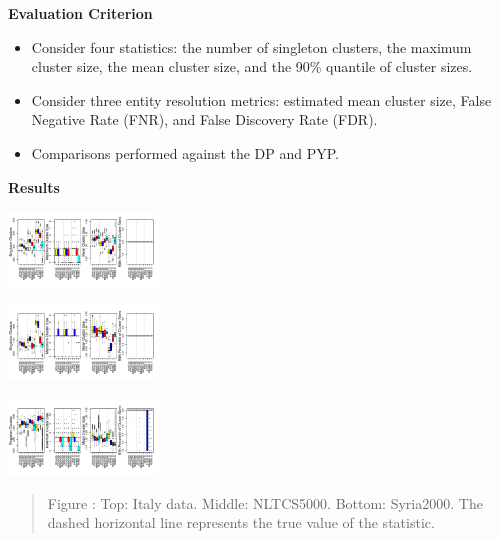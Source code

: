 \documentclass[portrait,a0b,final]{a0poster}
\newenvironment{poster}{
  \begin{center}
  \begin{minipage}[c]{0.98\textwidth}
}{
  \end{minipage}
  \end{center}
}
\newcommand{\mycaption}[1]{
  \vspace{0.25cm}
  \begin{quote}
    {{\sc Figure} \arabic{figure}: #1}
  \end{quote}
  \vspace{0.25cm}
  \stepcounter{figure}
}
\begin{document}
\begin{poster}
\begin{multicols}{3}
\begin{center}
\textbf{Evaluation Criterion}
\end{center}

\begin{itemize}
\item Consider four statistics: the number of
singleton clusters, the maximum cluster size, the mean cluster size,
and the 90\% quantile of cluster sizes. 
\item Consider three entity resolution metrics: estimated mean cluster size, False Negative Rate (FNR), and False Discovery Rate (FDR). 
\item Comparisons performed against the DP and PYP. 
\end{itemize}

\begin{center}
\textbf{Results}
\end{center}

\begin{center}
\includegraphics[width=0.3\textwidth]{figures/Stats_Italy_upd}

\vspace{-1cm}

\includegraphics[width=0.3\textwidth]{figures/Stats_NLTCS5000_upd}

\vspace{-1cm}

\includegraphics[width=0.3\textwidth]{figures/Stats_Syria2000_upd}
\vspace{-0.5cm}
\mycaption{Top: Italy data. Middle: NLTCS5000. Bottom: Syria2000. The dashed horizontal line represents the true value of the statistic.}
\end{center}


\end{multicols}
\end{poster}
\end{document}
